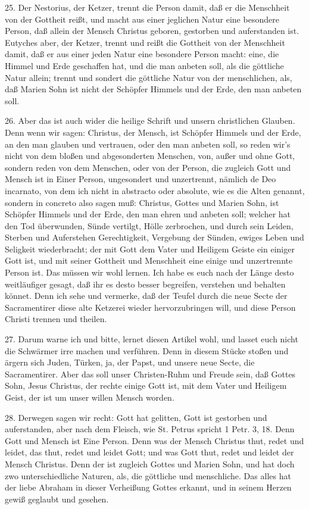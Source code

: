 25. Der Nestorius, der Ketzer, trennt die Person damit, daß er die Menschheit von der Gottheit reißt, und macht aus einer jeglichen Natur eine besondere Person, daß allein der Mensch Christus geboren, gestorben und auferstanden ist. Eutyches aber, der Ketzer, trennt und reißt die Gottheit von der Menschheit damit, daß er aus einer jeden Natur eine besondere Person macht: eine, die Himmel und Erde geschaffen hat, und die man anbeten soll, als die göttliche Natur allein; trennt und sondert die göttliche Natur von der menschlichen, als, daß Marien Sohn ist nicht der Schöpfer Himmels und der Erde, den man anbeten soll.

26. Aber das ist auch wider die heilige Schrift und unsern christlichen Glauben. Denn wenn wir sagen: Christus, der Mensch, ist Schöpfer Himmels und der Erde, an den man glauben und vertrauen, oder den man anbeten soll, so reden wir’s nicht von dem bloßen und abgesonderten Menschen, von, außer und ohne Gott, sondern reden von dem Menschen, oder von der Person, die zugleich Gott und Mensch ist in Einer Person, ungesondert und unzertrennt, nämlich de Deo incarnato, von dem ich nicht in abstracto oder absolute, wie es die Alten genannt, sondern in concreto also sagen muß: Christus, Gottes und Marien Sohn, ist Schöpfer Himmels und der Erde, den man ehren und anbeten soll; welcher hat den Tod überwunden, Sünde vertilgt, Hölle zerbrochen, und durch sein Leiden, Sterben und Auferstehen Gerechtigkeit, Vergebung der Sünden, ewiges Leben und Seligkeit wiederbracht; der mit Gott dem Vater und Heiligem Geiste ein einiger Gott ist, und mit seiner Gottheit und Menschheit eine einige und unzertrennte Person ist. Das müssen wir wohl lernen. Ich habe es euch nach der Länge desto weitläufiger gesagt, daß ihr es desto besser begreifen, verstehen und behalten könnet. Denn ich sehe und vermerke, daß der Teufel durch die neue Secte der Sacramentirer diese alte Ketzerei wieder hervorzubringen will, und diese Person Christi trennen und theilen.

27. Darum warne ich und bitte, lernet diesen Artikel wohl, und lasset euch nicht die Schwärmer irre machen und verführen. Denn in diesem Stücke stoßen und ärgern sich Juden, Türken, ja, der Papst, und unsere neue Secte, die Sacramentirer. Aber das soll unser Christen-Ruhm und Freude sein, daß Gottes Sohn, Jesus Christus, der rechte einige Gott ist, mit dem Vater und Heiligem Geist, der ist um unser willen Mensch worden.

28. Derwegen sagen wir recht: Gott hat gelitten, Gott ist gestorben und auferstanden, aber nach dem Fleisch, wie St. Petrus spricht 1 Petr. 3, 18. Denn Gott und Mensch ist Eine Person. Denn was der Mensch Christus thut, redet und leidet, das thut, redet und leidet Gott; und was Gott thut, redet und leidet der Mensch Christus. Denn der ist zugleich Gottes und Marien Sohn, und hat doch zwo unterschiedliche Naturen, als, die göttliche und menschliche. Das alles hat der liebe Abraham in dieser Verheißung Gottes erkannt, und in seinem Herzen gewiß geglaubt und gesehen.

